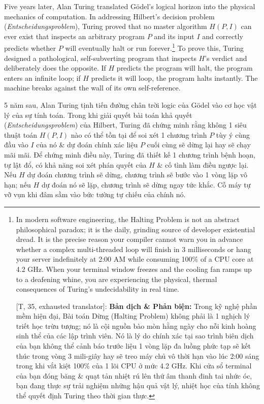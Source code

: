 \documentclass[11pt]{article}
\begin{document}
Five years later, Alan Turing translated G\"odel's logical horizon into the physical mechanics of computation. In addressing Hilbert's decision problem (\textit{Entscheidungsproblem}), Turing proved that no master algorithm $H(P, I)$ can ever exist that inspects an arbitrary program $P$ and its input $I$ and correctly predicts whether $P$ will eventually halt or run forever.\footnote{In modern software engineering, the Halting Problem is not an abstract philosophical paradox; it is the daily, grinding source of developer existential dread. It is the precise reason your compiler cannot warn you in advance whether a complex multi-threaded loop will finish in 3 milliseconds or hang your server indefinitely at 2:00 AM while consuming 100\% of a CPU core at 4.2 GHz. When your terminal window freezes and the cooling fan ramps up to a deafening whine, you are experiencing the physical, thermal consequences of Turing's undecidability in real time.
	
	\textsf{[T, 35, exhausted translator]:} \textbf{Bản dịch \& Phản biện:} Trong kỹ nghệ phần mềm hiện đại, Bài toán Dừng (Halting Problem) không phải là 1 nghịch lý triết học trừu tượng; nó là cội nguồn bào mòn hằng ngày cho nỗi kinh hoàng sinh thể của các lập trình viên. Nó là lý do chính xác tại sao trình biên dịch của bạn không thể cảnh báo trước liệu 1 vòng lặp đa luồng phức tạp sẽ kết thúc trong vòng 3 mili-giây hay sẽ treo máy chủ vô thời hạn vào lúc 2:00 sáng trong khi vắt kiệt 100\% của 1 lõi CPU ở mức 4.2 GHz. Khi cửa sổ terminal của bạn đóng băng \& quạt tản nhiệt rú lên thứ âm thanh đinh tai nhức óc, bạn đang thực sự trải nghiệm những hậu quả vật lý, nhiệt học của tính không thể quyết định Turing theo thời gian thực.} To prove this, Turing designed a pathological, self-subverting program that inspects $H$'s verdict and deliberately does the opposite. If $H$ predicts the program will halt, the program enters an infinite loop; if $H$ predicts it will loop, the program halts instantly. The machine breaks against the wall of its own self-reference.

5 năm sau, Alan Turing tịnh tiến đường chân trời logic của G\"odel vào cơ học vật lý của sự tính toán. Trong khi giải quyết bài toán khả quyết (\textit{Entscheidungsproblem}) của Hilbert, Turing đã chứng minh rằng không 1 siêu thuật toán $H(P, I)$ nào có thể tồn tại để soi xét 1 chương trình $P$ tùy ý cùng đầu vào $I$ của nó \& dự đoán chính xác liệu $P$ cuối cùng sẽ dừng lại hay sẽ chạy mãi mãi. Để chứng minh điều này, Turing đã thiết kế 1 chương trình bệnh hoạn, tự lật đổ, có khả năng soi xét phán quyết của $H$ \& cố tình làm điều ngược lại. Nếu $H$ dự đoán chương trình sẽ dừng, chương trình sẽ bước vào 1 vòng lặp vô hạn; nếu $H$ dự đoán nó sẽ lặp, chương trình sẽ dừng ngay tức khắc. Cỗ máy tự vỡ vụn khi đâm sầm vào bức tường tự chiếu của chính nó.
\end{document}

